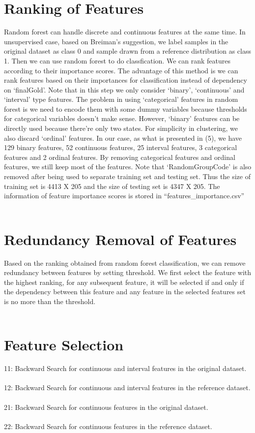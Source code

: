 \documentclass[11pt]{article}
\begin{document}
\section{Ranking of Features}
Random forest can handle discrete and continuous features at the same time. In unsupervised case, based on Breiman's suggestion, we label samples in the original dataset as class 0 and sample drawn from a reference distribution as class 1. Then we can use random forest to do classfication. We can rank features according to their importance scores. The advantage of this method is we can rank features based on their importances for classification instead of dependency on `finalGold'. Note that in this step we only consider `binary', `continuous' and `interval' type features. The problem in using `categorical' features in random forest is we need to encode them with some dummy variables because thresholds for categorical variables doesn't make sense. However, `binary' features can be directly used because there're only two states. For simplicity in clustering, we also discard `ordinal' features. In our case, as what is presented in (5), we have 129 binary features, 52 continuous features, 25 interval features, 3 categorical features and 2 ordinal features. By removing categorical features and ordinal features, we still keep most of the features. Note that `RandomGroupCode' is also removed after being used to separate training set and testing set. Thus the size of training set is 4413 X 205 and the size of testing set is 4347 X 205. The information of feature importance scores is stored in ``features\_importance.csv''\\
\\

\section{Redundancy Removal of Features}
Based on the ranking obtained from random forest classification, we can remove redundancy between features by setting threshold. We first select the feature with the highest ranking, for any subsequent feature, it will be selected if and only if the dependency between this feature and any feature in the selected features set is no more than the threshold.\\
\\

\section{Feature Selection}
11: Backward Search for continuous and interval features in the original dataset.\\
\\
12: Backward Search for continuous and interval features in the reference dataset.\\
\\
21: Backward Search for continuous features in the original dataset.\\
\\
22: Backward Search for continuous features in the reference dataset.\\
\\ 
\end{document}
